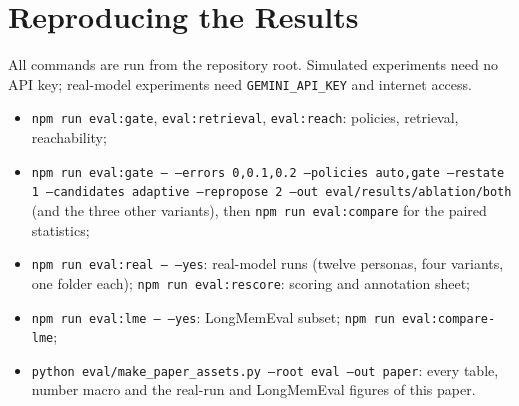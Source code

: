 \IfFileExists{IEEEtran.cls}{\documentclass[journal]{IEEEtran}\def\HAVEIEEE{1}}{\documentclass[10pt,twocolumn]{article}\usepackage[margin=0.7in,columnsep=0.25in]{geometry}}
\begin{document}
\begin{table}[!ht]
\centering\footnotesize
\caption{Reachability (mean number of candidates) by mode, store size $N$ and turn type.}
\label{tab:modesfull}
\end{table}

\section{Reproducing the Results}
All commands are run from the repository root. Simulated experiments need no API key; real-model experiments need \texttt{GEMINI\_API\_KEY} and internet access.
\begin{itemize}\setlength\itemsep{0pt}
\item \texttt{npm run eval:gate}, \texttt{eval:retrieval}, \texttt{eval:reach}: policies, retrieval, reachability;
\item \texttt{npm run eval:gate -- --errors 0,0.1,0.2 --policies auto,gate --restate 1 --candidates adaptive --repropose 2 --out eval/results/ablation/both} (and the three other variants), then \texttt{npm run eval:compare} for the paired statistics;
\item \texttt{npm run eval:real -- --yes}: real-model runs (twelve personas, four variants, one folder each); \texttt{npm run eval:rescore}: scoring and annotation sheet;
\item \texttt{npm run eval:lme -- --yes}: LongMemEval subset; \texttt{npm run eval:compare-lme};
\item \texttt{python eval/make\_paper\_assets.py --root eval --out paper}: every table, number macro and the real-run and LongMemEval figures of this paper.
\end{itemize}

\ifdefined\HAVEIEEE\else\fi

\end{document}
